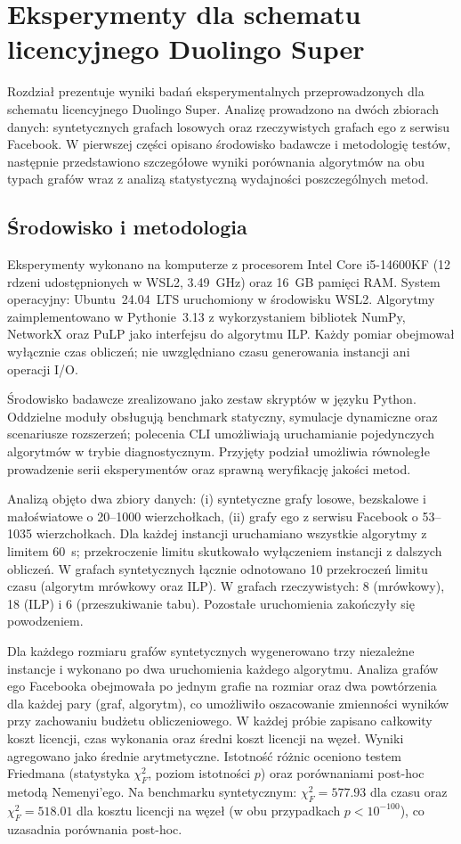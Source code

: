 \chapter{Eksperymenty dla schematu licencyjnego Duolingo Super}
\label{chap:experiments}

Rozdział prezentuje wyniki badań eksperymentalnych przeprowadzonych dla schematu licencyjnego Duolingo Super. Analizę prowadzono na dwóch zbiorach danych: syntetycznych grafach losowych oraz rzeczywistych grafach ego z serwisu Facebook. W pierwszej części opisano środowisko badawcze i metodologię testów, następnie przedstawiono szczegółowe wyniki porównania algorytmów na obu typach grafów wraz z analizą statystyczną wydajności poszczególnych metod.

\section{Środowisko i metodologia}

Eksperymenty wykonano na komputerze z procesorem Intel Core i5-14600KF (12 rdzeni udostępnionych w WSL2, 3.49~GHz) oraz 16~GB pamięci RAM. System operacyjny: Ubuntu~24.04~LTS uruchomiony w środowisku WSL2. Algorytmy zaimplementowano w Pythonie~3.13 z wykorzystaniem bibliotek NumPy, NetworkX oraz PuLP jako interfejsu do algorytmu ILP. Każdy pomiar obejmował wyłącznie czas obliczeń; nie uwzględniano czasu generowania instancji ani operacji I/O.

Środowisko badawcze zrealizowano jako zestaw skryptów w języku Python. Oddzielne moduły obsługują benchmark statyczny, symulacje dynamiczne oraz scenariusze rozszerzeń; polecenia CLI umożliwiają uruchamianie pojedynczych algorytmów w trybie diagnostycznym. Przyjęty podział umożliwia równoległe prowadzenie serii eksperymentów oraz sprawną weryfikację jakości metod.

Analizą objęto dwa zbiory danych: (i) syntetyczne grafy losowe, bezskalowe i małoświatowe o 20--1000 wierzchołkach, (ii) grafy ego z serwisu Facebook o 53--1035 wierzchołkach. Dla każdej instancji uruchamiano wszystkie algorytmy z limitem 60~s; przekroczenie limitu skutkowało wyłączeniem instancji z dalszych obliczeń. W grafach syntetycznych łącznie odnotowano 10 przekroczeń limitu czasu (algorytm mrówkowy oraz ILP). W grafach rzeczywistych: 8 (mrówkowy), 18 (ILP) i 6 (przeszukiwanie tabu). Pozostałe uruchomienia zakończyły się powodzeniem.

Dla każdego rozmiaru grafów syntetycznych wygenerowano trzy niezależne instancje i wykonano po dwa uruchomienia każdego algorytmu. Analiza grafów ego Facebooka obejmowała po jednym grafie na rozmiar oraz dwa powtórzenia dla każdej pary (graf, algorytm), co umożliwiło oszacowanie zmienności wyników przy zachowaniu budżetu obliczeniowego. W każdej próbie zapisano całkowity koszt licencji, czas wykonania oraz średni koszt licencji na węzeł. Wyniki agregowano jako średnie arytmetyczne. Istotność różnic oceniono testem Friedmana (statystyka $\chi^2_F$, poziom istotności $p$) oraz porównaniami post-hoc metodą Nemenyi'ego. Na benchmarku syntetycznym: $\chi^2_F=577.93$ dla czasu oraz $\chi^2_F=518.01$ dla kosztu licencji na węzeł (w obu przypadkach $p<10^{-100}$), co uzasadnia porównania post-hoc.

